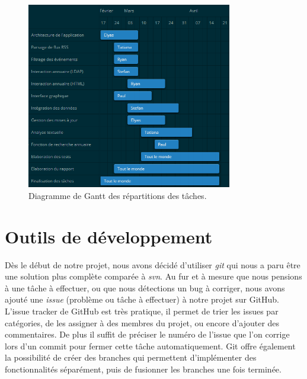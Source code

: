 \begin{figure}[h]
  \center
  \includegraphics[width=0.8\textwidth]{resources/gantt.png}
  \caption{Diagramme de Gantt des répartitions des tâches.}
\end{figure}


\section{Outils de développement}
Dès le début de notre projet, nous avons décidé d’utiliser \emph{git} qui nous a paru être une solution plus complète comparée à \emph{svn}. Au fur et à mesure que nous pensions à une tâche à effectuer, ou que nous détections un bug à corriger, nous avons ajouté une \emph{issue} (problème ou tâche à effectuer) à notre projet sur GitHub. L’issue tracker de GitHub est très pratique, il permet de trier les issues par catégories, de les assigner à des membres du projet, ou encore d’ajouter des commentaires. De plus il suffit de préciser le numéro de l’issue que l’on corrige lors d’un commit pour fermer cette tâche automatiquement. Git offre également la possibilité de créer des branches qui permettent d’implémenter des fonctionnalités séparément, puis de fusionner les branches une fois terminée.

